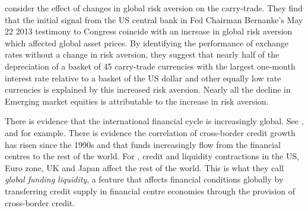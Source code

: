 \documentclass[12pt, a4paper, oneside]{article}\usepackage[]{graphicx}\usepackage[]{color}
\begin{document}
\citet{NYFedtaper} consider the effect of changes in global risk aversion on the carry-trade.  They find that the initial signal from the US central bank in Fed Chairman Bernanke's May 22 2013 testimony to Congress coincide with an increase in global risk aversion which affected global asset prices. %
By identifying the performance of exchange rates without a change in risk aversion, they suggest that nearly half of the depreciation of a basket of 45 carry-trade currencies with the largest one-month interest rate relative to a basket of the US dollar and other equally low rate currencies is explained by this increased risk aversion. Nearly all the decline in Emerging market equities is attributable to the increase in risk aversion.

There is evidence that the international financial cycle is increasingly global.  See \citet{Rey2013}, \citet{Obstfeld2014} and \citet{Bruno2014} for example.  %
There is evidence the correlation of cross-border credit growth has risen since the 1990s and that funds increasingly flow from the financial centres to the rest of the world. For \citet{Cerutti2014}, credit and liquidity contractions in  the US, Euro zone, UK and Japan affect the rest of the world.   This is what they call \emph{global funding liquidity}, a feature that affects financial conditions globally by transferring credit supply in financial centre economies through the provision of cross-border credit.



\end{document}
